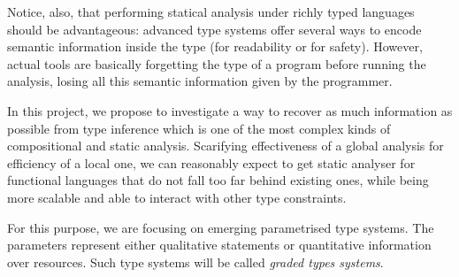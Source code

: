 \documentclass{article}[11pt]
\begin{document}
Notice, also, that performing statical analysis under richly typed languages should be advantageous:  advanced type systems offer several ways to encode semantic information inside the type (for readability or for safety). However, actual tools are basically forgetting the type of a program before running the analysis, losing all this semantic information given by the programmer.

In this project, we propose to investigate a way to recover as much information as possible from type inference which is one of the most complex kinds of compositional and static analysis. %
Scarifying effectiveness of a global analysis for efficiency of a local one, we can reasonably expect to get static analyser for functional languages that do not fall too far behind existing ones, while being more scalable and able to interact with other type constraints.


For this purpose, we are focusing on emerging parametrised type systems. The parameters represent either qualitative statements or quantitative information over resources. Such type systems will be called {\em graded types systems}.
\end{document}
